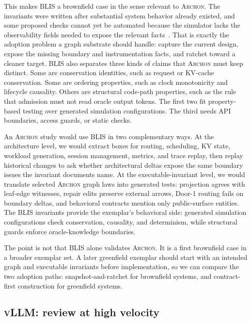 \documentclass[sigconf,review,anonymous]{acmart}
\theoremstyle{plain}
\theoremstyle{definition}
\begin{document}
This makes BLIS a brownfield case in the sense relevant to \textsc{Archon}. The
invariants were written after substantial system behavior already existed, and
some proposed checks cannot yet be automated because the simulator lacks the
observability fields needed to expose the relevant facts~\cite{blisobservability}.
That is exactly the adoption problem a graph substrate should handle: capture
the current design, expose the missing boundary and instrumentation facts, and
ratchet toward a cleaner target. BLIS also separates three kinds of claims that
\textsc{Archon} must keep distinct. Some are conservation identities, such as request or
KV-cache conservation. Some are ordering properties, such as clock monotonicity
and lifecycle causality. Others are structural code-path properties, such as the
rule that admission must not read oracle output tokens. The first two fit
property-based testing over generated simulation configurations. The third needs
API boundaries, access guards, or static checks.

An \textsc{Archon} study would use BLIS in two complementary ways. At the architecture
level, we would extract boxes for routing, scheduling, KV state, workload
generation, session management, metrics, and trace replay, then replay
historical changes to ask whether architectural deltas expose the same boundary
issues the invariant documents name. At the executable-invariant level, we would
translate selected \textsc{Archon} graph laws into generated tests: projection agrees
with leaf-edge witnesses, repair edits preserve external arrows, Door-1 routing
fails on boundary deltas, and behavioral contracts mention only public-surface
entities. The BLIS invariants provide the exemplar's behavioral side: generated
simulation configurations check conservation, causality, and determinism, while
structural guards enforce oracle-knowledge boundaries.

The point is not that BLIS alone validates \textsc{Archon}. It is a first brownfield case
in a broader exemplar set. A later greenfield exemplar should start with an
intended graph and executable invariants before implementation, so we can compare
the two adoption paths: snapshot-and-ratchet for brownfield systems, and
contract-first construction for greenfield systems.

\subsection{\textsc{vLLM}: review at high velocity}
\label{app:vllm}
\end{document}
